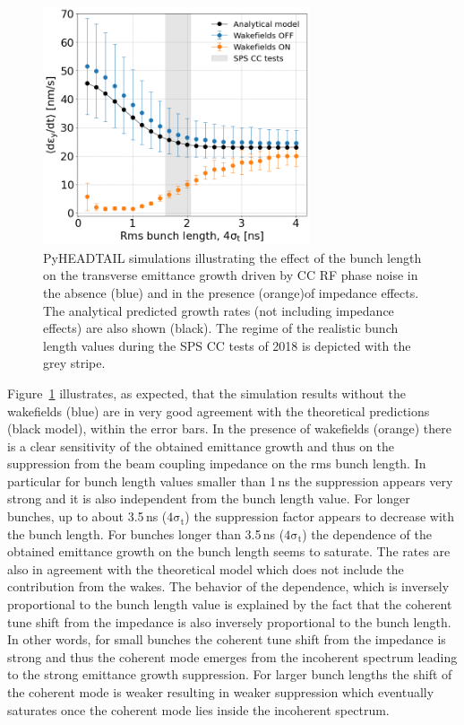 \begin{figure}[!h] %
    \centering         
    \includegraphics[width=0.7\textwidth]{images/Ch7/deyRates_sps_PN1e-8_00MHz_270GeV_wakesOFF_vs_ON_QpxQpy5e-1_Nb5e5_ayy2000_slices500_intensity3e10_sigmaScanScanZvsTheorywithoutWakes_vs_SPS_sigmaz_ignore_first_point.png}
        \caption{PyHEADTAIL simulations illustrating the effect of the bunch length on the transverse emittance growth driven by CC RF phase noise in the absence (blue) and in the presence (orange)of impedance effects. The analytical predicted growth rates (not including impedance effects) are also shown (black). The regime of the realistic bunch length values during the SPS CC tests of 2018 is depicted with the grey stripe.}
        \label{fig:study_10_bunch_length}
 \end{figure}

 Figure~\ref{fig:study_10_bunch_length} illustrates, as expected, that the simulation results without the wakefields (blue) are in very good agreement with the theoretical predictions (black model), within the error bars. In the presence of wakefields (orange) there is a clear sensitivity of the obtained emittance growth and thus on the suppression from the beam coupling impedance on the rms bunch length. In particular for bunch length values smaller than 1\,ns the suppression appears very strong and it is also independent from the bunch length value. For longer bunches, up to about 3.5\,ns ($\mathrm{4 \sigma_t}$) the suppression factor appears to decrease with the bunch length. For bunches longer than 3.5\,ns ($\mathrm{4 \sigma_t}$) the dependence of the obtained emittance growth on the bunch length seems to saturate. The rates are also in agreement with the theoretical model which does not include the contribution from the wakes. The behavior of the dependence, which is inversely proportional to the bunch length value is explained by the fact that the coherent tune shift from the impedance is also inversely proportional to the bunch length. In other words, for small bunches the coherent tune shift from the impedance is strong and thus the coherent mode emerges from the incoherent spectrum leading to the strong emittance growth suppression. For larger bunch lengths the shift of the coherent mode is weaker resulting in weaker suppression which eventually saturates once the coherent mode lies inside the incoherent spectrum.

